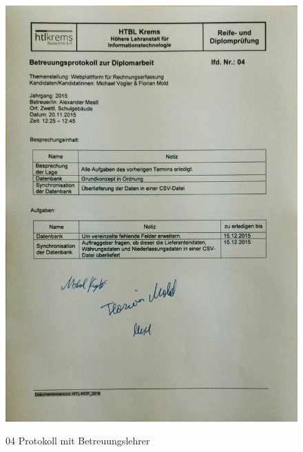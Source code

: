 \begin{figure}[!h]
    \centering
    \includegraphics[width=13cm]{figures/Mestl_04.jpg}
    \label{fig:04_Protokoll_Betreuungslehrer}
    \caption{04 Protokoll mit Betreuungslehrer}
\end{figure}
\newpage
